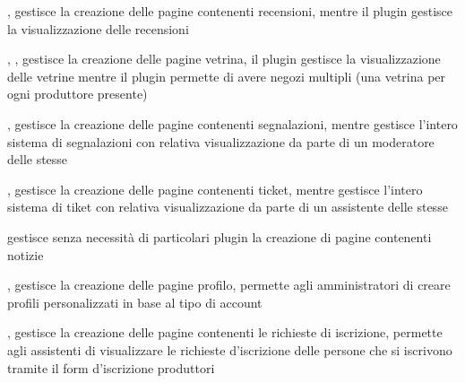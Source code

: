 
{, }
{ gestisce la creazione delle pagine contenenti recensioni, mentre il plugin  gestisce la visualizzazione delle recensioni}


{, , }
{ gestisce la creazione delle pagine vetrina, il plugin  gestisce la visualizzazione delle vetrine mentre il plugin  permette di avere negozi multipli (una vetrina per ogni produttore presente)}


{, }
{ gestisce la creazione delle pagine contenenti segnalazioni, mentre  gestisce l'intero sistema di segnalazioni con relativa visualizzazione da parte di un moderatore delle stesse}


{, }
{ gestisce la creazione delle pagine contenenti ticket, mentre  gestisce l'intero sistema di tiket con relativa visualizzazione da parte di un assistente delle stesse}


{}
{ gestisce senza necessità di particolari plugin la creazione di pagine contenenti notizie}


{, }
{ gestisce la creazione delle pagine profilo,  permette agli amministratori di creare profili personalizzati in base al tipo di account}


{, }
{ gestisce la creazione delle pagine contenenti le richieste di iscrizione,  permette agli assistenti di visualizzare le richieste d'iscrizione delle persone che si iscrivono tramite il form d'iscrizione produttori}


